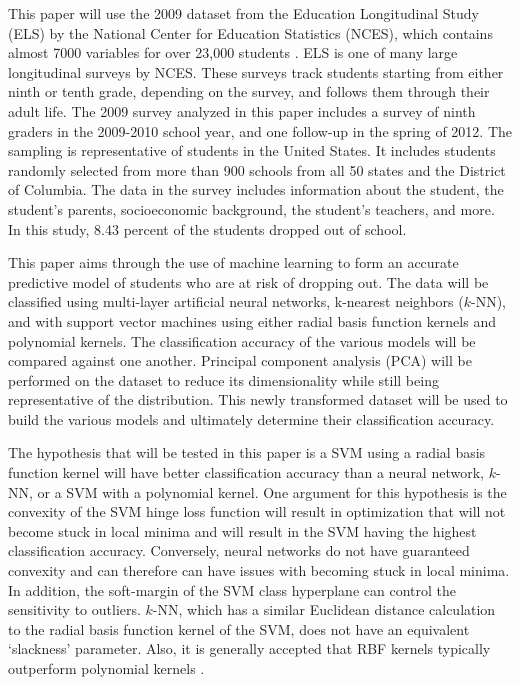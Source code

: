 \documentclass[twoside,11pt]{article}
\begin{document}
This paper will use the 2009 dataset from the Education Longitudinal Study
(ELS) by the National Center for Education Statistics (NCES), which contains
almost 7000 variables for over 23,000 students \cite{Ingels:2013}. ELS is one
of many large longitudinal surveys by NCES. These surveys track students
starting from either ninth or tenth grade, depending on the survey, and follows
them through their adult life.  The 2009 survey analyzed in this paper includes
a survey of ninth graders in the 2009-2010 school year, and one follow-up in
the spring of 2012.  The sampling is representative of students in the United
States.  It includes students randomly selected from more than 900 schools from
all 50 states and the District of Columbia.  The data in the survey includes
information about the student, the student's parents, socioeconomic background,
the student's teachers, and more.  In this study, 8.43 percent of the students
dropped out of school.

This paper aims through the use of machine learning to form an accurate
predictive model of students who are at risk of dropping out.  The data will be
classified using multi-layer artificial neural networks, k-nearest neighbors
($k$-NN), and with support vector machines using either radial basis function
kernels and polynomial kernels.  The classification accuracy of the various
models will be compared against one another.  Principal component analysis
(PCA) will be performed on the dataset to reduce its dimensionality while still
being representative of the distribution.  This newly transformed dataset will
be used to build the various models and ultimately determine their
classification accuracy.

The hypothesis that will be tested in this paper is a SVM using a radial basis
function kernel will have better classification accuracy than a neural network,
$k$-NN, or a SVM with a polynomial kernel.  One argument for this hypothesis is
the convexity of the SVM hinge loss function will result in optimization that
will not become stuck in local minima and will result in the SVM having the
highest classification accuracy.  Conversely, neural networks do not have
guaranteed convexity and can therefore can have issues with becoming stuck in
local minima.  In addition, the soft-margin of the SVM class hyperplane can
control the sensitivity to outliers.  $k$-NN, which has a similar Euclidean
distance calculation to the radial basis function kernel of the SVM, does not
have an equivalent `slackness' parameter.  Also, it is generally accepted that
RBF kernels typically outperform polynomial kernels \cite{Chang:2010}.   
\end{document}
